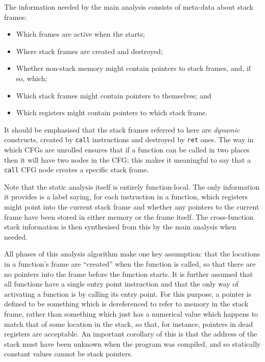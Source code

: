 The information needed by the main analysis consists of meta-data
about stack frames:

\begin{itemize}
\item
  Which frames are active when the {\StateMachine} starts;
\item
  Where stack frames are created and destroyed;
\item
  Whether non-stack memory might contain pointers to stack frames,
  and, if so, which;
\item
  Which stack frames might contain pointers to themselves; and
\item
  Which registers might contain pointers to which stack frame.
\end{itemize}

It should be emphasised that the stack frames referred to here are
\emph{dynamic} constructs, created by \verb|call| instructions and
destroyed by \verb|ret| ones.  The way in which CFGs are unrolled
ensures that if a function can be called in two places then it will
have two nodes in the CFG; this makes it meaningful to say that a
\verb|call| CFG node creates a specific stack frame.

Note that the static analysis itself is entirely function-local.  The
only information it provides is a label saying, for each instruction
in a function, which registers might point into the current stack
frame and whether any pointers to the current frame have been stored
in either memory or the frame itself.  The cross-function stack
information is then synthesised from this by the main analysis when
needed.

\label{sect:function_head}
All phases of this analysis algorithm make one key assumption: that
the locations in a function's frame are ``created'' when the function
is called, so that there are no pointers into the frame before the
function starts.  It is further assumed that all functions have a
single entry point instruction and that the only way of activating a
function is by calling its entry point.  For this purpose, a pointer
is defined to be something which is dereferenced to refer to memory in
the stack frame, rather than something which just has a numerical
value which happens to match that of some location in the stack, so
that, for instance, pointers in dead registers are acceptable.  An
important corollary of this is that the address of the stack must have
been unknown when the program was compiled, and so statically constant
values cannot be stack pointers.

